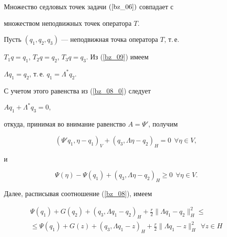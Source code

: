 \begin{thm} \label{bz_T3}


Множество седловых точек задачи $(\ref{bz_06})$ совпадает с 


множеством неподвижных точек оператора $T$.


\end{thm}





\begin{pf}


Пусть $(q_1, q_2, q_3)$ --- неподвижная точка оператора $T$, т.\,е. 


${T_1q=q_1}$, ${T_2q=q_2}$, ${T_3q=q_3}$. Из (\ref{bz_09}) имеем


$\Lambda q_1=q_2$, т.\,е. $q_1=\Lambda^* q_2$.


С учетом этого равенства из (\ref{bz_08_0}) следует


$A q_1+\Lambda^* q_3=0$,


откуда, принимая во внимание равенство $A=\Psi '$, получим


$$


(\Psi' q_1, \eta-q_1)_V+(q_3 , \Lambda \eta-q_2)_H=0


\ \ \forall \eta \in V,


$$


и


\begin{equation}


\Psi (\eta)-\Psi (q_1)+(q_3 , \Lambda \eta-q_2)_H \geq 0


\ \ \forall \eta \in V.


\label{bz_10}


\end{equation}





Далее, расписывая соотношение (\ref{bz_08}), имеем


\begin{multline}


\Psi (q_1)+G(q_2)+(q_3, \Lambda q_1-q_2)_H+


\frac {r} {2} \| {\Lambda q_1-q_2} \|_H^2 \leq \\


%


\leq \Psi (q_1)+G(z)+(q_3, \Lambda q_1-z)_H+


\frac {r} {2} \| {\Lambda q_1-z} \|_H^2 \ \ \forall z \in H


\label{bz_10_1}



\end{multline}
\end{pf}
